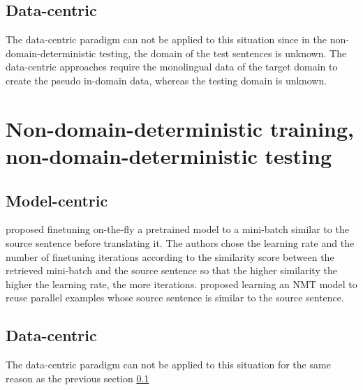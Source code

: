 \subsection{Data-centric} \label{ssec:data-centric}
The data-centric paradigm can not be applied to this situation since in the non-domain-deterministic testing, the domain of the test sentences is unknown. The data-centric approaches require the monolingual data of the target domain to create the pseudo in-domain data, whereas the testing domain is unknown.
\section{Non-domain-deterministic training, non-domain-deterministic testing}
\label{sec:case4}
\subsection{Model-centric}
\citet{Li18onesentence, Farajian17multidomain} proposed finetuning on-the-fly a pretrained model to a mini-batch similar to the source sentence before translating it. The authors chose the learning rate and the number of finetuning iterations according to the similarity score between the retrieved mini-batch and the source sentence so that the higher similarity the higher the learning rate, the more iterations. \citet{Pham20Priming,xu20boosting,bulte19neural,bapna19non} proposed learning an NMT model to reuse parallel examples whose source sentence is similar to the source sentence. 
\subsection{Data-centric}
The data-centric paradigm can not be applied to this situation for the same reason as the previous section \ref{ssec:data-centric}

